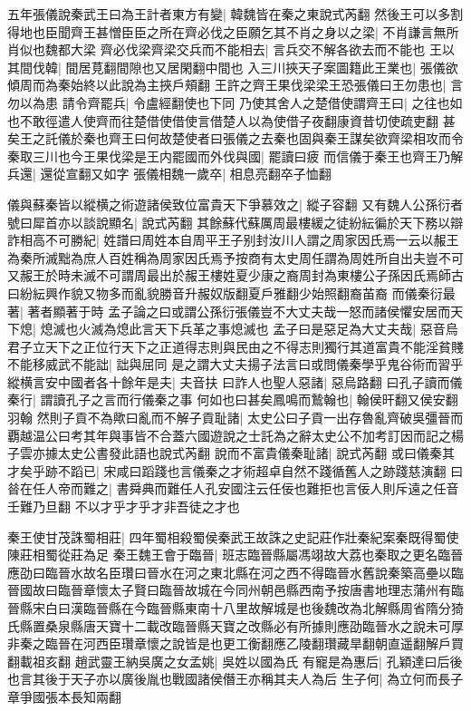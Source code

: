 五年張儀說秦武王曰為王計者東方有變|{
	韓魏皆在秦之東說式芮翻
	}
然後王可以多割得地也臣聞齊王甚憎臣臣之所在齊必伐之臣願乞其不肖之身以之梁|{
	不肖謙言無所肖似也魏都大梁
	}
齊必伐梁齊梁交兵而不能相去|{
	言兵交不解各欲去而不能也
	}
王以其間伐韓|{
	間居莧翻間隙也又居閑翻中間也
	}
入三川挾天子案圖籍此王業也|{
	張儀欲傾周而為秦始終以此說為主挾戶頰翻
	}
王許之齊王果伐梁梁王恐張儀曰王勿患也|{
	言勿以為患
	}
請令齊罷兵|{
	令盧經翻使也下同
	}
乃使其舍人之楚借使謂齊王曰|{
	之往也如也不敢徑遣人使齊而往楚借使借使言借楚人以為使借子夜翻康資昔切使疏吏翻
	}
甚矣王之託儀於秦也齊王曰何故楚使者曰張儀之去秦也固與秦王謀矣欲齊梁相攻而令秦取三川也今王果伐梁是王内罷國而外伐與國|{
	罷讀曰疲
	}
而信儀于秦王也齊王乃解兵還|{
	還從宣翻又如字
	}
張儀相魏一歲卒|{
	相息亮翻卒子恤翻
	}


儀與蘇秦皆以縱横之術遊諸侯致位富貴天下爭慕效之|{
	縱子容翻
	}
又有魏人公孫衍者號曰犀首亦以談說顯名|{
	說式芮翻
	}
其餘蘇代蘇厲周最樓緩之徒紛紜徧於天下務以辯詐相高不可勝紀|{
	姓譜曰周姓本自周平王子别封汝川人謂之周家因氏焉一云以赧王為秦所滅黜為庶人百姓稱為周家因氏焉予按商有太史周任謂為周姓所自出夫豈不可又赧王於時未滅不可謂周最出於赧王樓姓夏少康之裔周封為東樓公子孫因氏焉師古曰紛紜興作貌又物多而亂貌勝音升赧奴版翻夏戶雅翻少始照翻裔苖裔
	}
而儀秦衍最著|{
	著者顯著于時
	}
孟子論之曰或謂公孫衍張儀豈不大丈夫哉一怒而諸侯懼安居而天下熄|{
	熄滅也火滅為熄此言天下兵革之事熄滅也
	}
孟子曰是惡足為大丈夫哉|{
	惡音烏
	}
君子立天下之正位行天下之正道得志則與民由之不得志則獨行其道富貴不能淫貧賤不能移威武不能詘|{
	詘與屈同
	}
是之謂大丈夫揚子法言曰或問儀秦學乎鬼谷術而習乎縱横言安中國者各十餘年是夫|{
	夫音扶
	}
曰詐人也聖人惡諸|{
	惡烏路翻
	}
曰孔子讀而儀秦行|{
	謂讀孔子之言而行儀秦之事
	}
何如也曰甚矣鳳鳴而鷙翰也|{
	翰侯旰翻又侯安翻羽翰
	}
然則子貢不為歟曰亂而不解子貢耻諸|{
	太史公曰子貢一出存魯亂齊破吳彊晉而覇越温公曰考其年與事皆不合蓋六國遊說之士託為之辭太史公不加考訂因而記之楊子雲亦據太史公書發此語也說式芮翻
	}
說而不富貴儀秦耻諸|{
	說式芮翻
	}
或曰儀秦其才矣乎跡不蹈已|{
	宋咸曰蹈踐也言儀秦之才術超卓自然不踐循舊人之跡踐慈演翻
	}
曰㫺在任人帝而難之|{
	書舜典而難任人孔安國注云任佞也難拒也言佞人則斥遠之任音壬難乃旦翻
	}
不以才乎才乎才非吾徒之才也

秦王使甘茂誅蜀相莊|{
	四年蜀相殺蜀侯秦武王故誅之史記莊作壯秦紀案秦既得蜀使陳莊相蜀從莊為足
	}
秦王魏王會于臨晉|{
	班志臨晉縣屬馮翊故大荔也秦取之更名臨晉應劭曰臨晉水故名臣瓚曰晉水在河之東北縣在河之西不得臨晉水舊說秦築高壘以臨晉國故曰臨晉章懷太子賢曰臨晉故城在今同州朝邑縣西南予按唐書地理志蒲州有臨晉縣宋白曰漢臨晉縣在今臨晉縣東南十八里故解城是也後魏改為北解縣周省隋分猗氏縣置桑泉縣唐天寶十二載改臨晉縣天寶之改縣必有所據則應劭臨晉水之說未可厚非秦之臨晉在河西臣瓚章懷之說皆是也更工衡翻應乙陵翻瓚藏旱翻朝直遥翻解戶買翻載祖亥翻
	}
趙武靈王納吳廣之女孟姚|{
	吳姓以國為氏
	}
有寵是為惠后|{
	孔穎達曰后後也言其後于天子亦以廣後胤也戰國諸侯僭王亦稱其夫人為后
	}
生子何|{
	為立何而長子章爭國張本長知兩翻
	}


